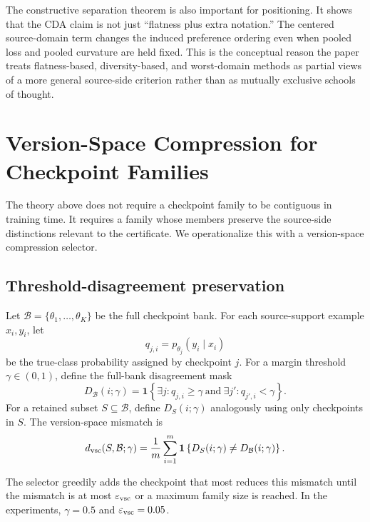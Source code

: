 \documentclass{article}
\theoremstyle{definition}
\newcommand{\cB}{\mathcal{B}}
\newcommand{\eps}{\varepsilon}
\newcommand{\braces}[1]{\left\{ #1 \right\}}
\begin{document}
The constructive separation theorem is also important for positioning. It shows that the CDA claim is not just ``flatness plus extra notation.'' The centered source-domain term changes the induced preference ordering even when pooled loss and pooled curvature are held fixed. This is the conceptual reason the paper treats flatness-based, diversity-based, and worst-domain methods as partial views of a more general source-side criterion rather than as mutually exclusive schools of thought.

\section{Version-Space Compression for Checkpoint Families}
\label{sec:vsc}

The theory above does not require a checkpoint family to be contiguous in training time. It requires a family whose members preserve the source-side distinctions relevant to the certificate. We operationalize this with a version-space compression selector.

\subsection{Threshold-disagreement preservation}

Let \(\cB=\{\theta_1,\dots,\theta_K\}\) be the full checkpoint bank. For each source-support example \(x_i,y_i\), let
\[
q_{j,i}=p_{\theta_j}(y_i\mid x_i)
\]
be the true-class probability assigned by checkpoint \(j\). For a margin threshold \(\gamma\in(0,1)\), define the full-bank disagreement mask
\begin{equation}
D_\cB(i;\gamma)
=
\mathbf{1}\braces{
\exists j: q_{j,i}\ge \gamma
\ \text{and}\ 
\exists j': q_{j',i}<\gamma
}.
\label{eq:full_disagreement}
\end{equation}
For a retained subset \(S\subseteq\cB\), define \(D_S(i;\gamma)\) analogously using only checkpoints in \(S\). The version-space mismatch is
\begin{equation}
d_{\rm vsc}(S,\cB;\gamma)
=
\frac{1}{m}\sum_{i=1}^m
\mathbf{1}\braces{D_S(i;\gamma)\ne D_\cB(i;\gamma)}.
\label{eq:vsc_mismatch}
\end{equation}

The selector greedily adds the checkpoint that most reduces this mismatch until the mismatch is at most \(\eps_{\rm vsc}\) or a maximum family size is reached. In the experiments, \(\gamma=0.5\) and \(\eps_{\rm vsc}=0.05\).
\end{document}
